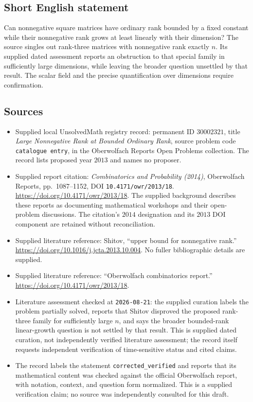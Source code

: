 \documentclass[11pt]{article}
\begin{document}
\subsection{Short English statement}
Can nonnegative square matrices have ordinary rank bounded by a fixed constant while their nonnegative rank grows at least linearly with their dimension? The source singles out rank-three matrices with nonnegative rank exactly \(n\). Its supplied dated assessment reports an obstruction to that special family in sufficiently large dimensions, while leaving the broader question unsettled by that result. The scalar field and the precise quantification over dimensions require confirmation.
\subsection{Sources}
\begin{itemize}
\item Supplied local UnsolvedMath registry record: permanent ID \(30002321\), title \emph{Large Nonnegative Rank at Bounded Ordinary Rank}, source problem code \texttt{catalogue entry}, in the Oberwolfach Reports Open Problems collection. The record lists proposed year \(2013\) and names no proposer.
\item Supplied report citation: \emph{Combinatorics and Probability (2014)}, Oberwolfach Reports, pp.\ 1087--1152, DOI \texttt{10.4171/owr/2013/18}. \url{https://doi.org/10.4171/owr/2013/18}. The supplied background describes these reports as documenting mathematical workshops and their open-problem discussions. The citation's \(2014\) designation and its \(2013\) DOI component are retained without reconciliation.
\item Supplied literature reference: Shitov, ``upper bound for nonnegative rank.'' \url{https://doi.org/10.1016/j.jcta.2013.10.004}. No fuller bibliographic details are supplied.
\item Supplied literature reference: ``Oberwolfach combinatorics report.'' \url{https://doi.org/10.4171/owr/2013/18}.
\item Literature assessment checked at \texttt{2026-08-21}: the supplied curation labels the problem partially solved, reports that Shitov disproved the proposed rank-three family for sufficiently large \(n\), and says the broader bounded-rank linear-growth question is not settled by that result. This is supplied dated curation, not independently verified literature assessment; the record itself requests independent verification of time-sensitive status and cited claims.
\item The record labels the statement \texttt{corrected\_verified} and reports that its mathematical content was checked against the official Oberwolfach report, with notation, context, and question form normalized. This is a supplied verification claim; no source was independently consulted for this draft.
\end{itemize}
\end{document}
